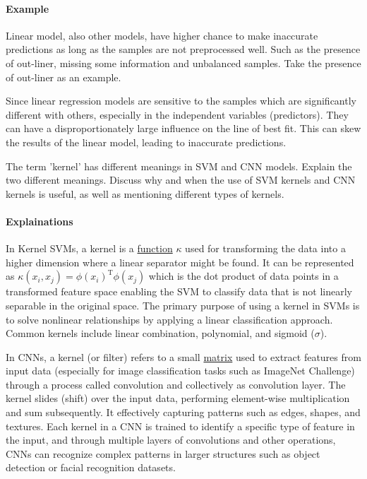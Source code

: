 \paragraph{Example}
Linear model, also other models, have higher chance to make inaccurate predictions
as long as the samples are not preprocessed well. 
Such as the presence of out-liner, missing some information and unbalanced samples.
Take the presence of out-liner as an example.

Since linear regression models are sensitive to the samples which are 
significantly different with others, 
especially in the independent variables (predictors).
They can have a disproportionately large influence on the line of best fit. 
This can skew the results of the linear model, leading to inaccurate predictions.

\vspace{1em}
\thequestion The term 'kernel' has different meanings in SVM and CNN models. Explain the two
different meanings. Discuss why and when the use of SVM kernels and CNN kernels is
useful, as well as mentioning different types of kernels.
\paragraph{Explainations}
In Kernel SVMs, 
a kernel is a \underline{function} $\kappa$
used for transforming the data into a higher dimension 
where a linear separator might be found. 
It can be represented as $\kappa(x_{i}, x_{j}) = \phi(x_i)^{\text{T}}\phi(x_j)$
which is the dot product of data points 
in a transformed feature space 
enabling the SVM to classify data that 
is not linearly separable in the original space.
The primary purpose of using a kernel in SVMs 
is to solve nonlinear relationships 
by applying a linear classification approach. 
Common kernels include linear combination, polynomial, and sigmoid ($\sigma$). 

In CNNs, a kernel (or filter) refers to a small \underline{matrix} used to extract 
features from input data (especially for image classification tasks such as 
ImageNet Challenge) through a process called convolution and collectively as 
convolution layer. 
The kernel slides (shift) over the input data, 
performing element-wise multiplication 
and sum subsequently.
It effectively capturing patterns such as 
edges, shapes, and textures. 
Each kernel in a CNN is trained to identify a specific type 
of feature in the input, and through multiple layers of 
convolutions and other operations, 
CNNs can recognize complex patterns in larger structures such 
as object detection or facial recognition datasets.

